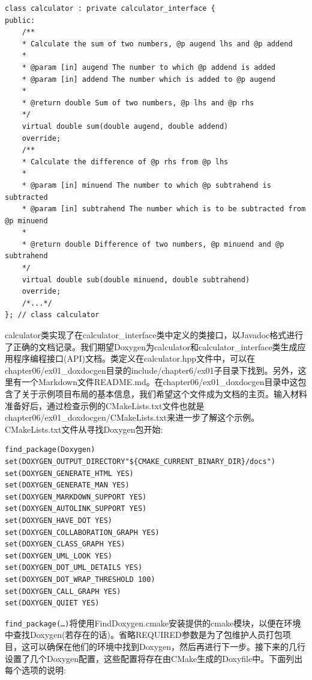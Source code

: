 \begin{lstlisting}[style=styleCXX]
class calculator : private calculator_interface {
public:
	/**
	* Calculate the sum of two numbers, @p augend lhs and @p addend
	*
	* @param [in] augend The number to which @p addend is added
	* @param [in] addend The number which is added to @p augend
	*
	* @return double Sum of two numbers, @p lhs and @p rhs
	*/
	virtual double sum(double augend, double addend)
	override;
	/**
	* Calculate the difference of @p rhs from @p lhs
	*
	* @param [in] minuend The number to which @p subtrahend is subtracted
	* @param [in] subtrahend The number which is to be subtracted from @p minuend
	*
	* @return double Difference of two numbers, @p minuend and @p subtrahend
	*/
	virtual double sub(double minuend, double subtrahend)
	override;
	/*...*/
}; // class calculator
\end{lstlisting}

calculator类实现了在calculator\_interface类中定义的类接口，以Javadoc格式进行了正确的文档记录。我们期望Doxygen为calculator和calculator\_interface类生成应用程序编程接口(API)文档。类定义在calculator.hpp文件中，可以在chapter06/ex01\_doxdocgen目录的include/chapter6/ex01子目录下找到。另外，这里有一个Markdown文件README.md。在chapter06/ex01\_doxdocgen目录中这包含了关于示例项目布局的基本信息，我们希望这个文件成为文档的主页。输入材料准备好后，通过检查示例的CMakeLists.txt文件也就是chapter06/ex01\_doxdocgen/CMakeLists.txt来进一步了解这个示例。CMakeLists.txt文件从寻找Doxygen包开始:

\begin{lstlisting}[style=styleCMake]
find_package(Doxygen)
set(DOXYGEN_OUTPUT_DIRECTORY"${CMAKE_CURRENT_BINARY_DIR}/docs")
set(DOXYGEN_GENERATE_HTML YES)
set(DOXYGEN_GENERATE_MAN YES)
set(DOXYGEN_MARKDOWN_SUPPORT YES)
set(DOXYGEN_AUTOLINK_SUPPORT YES)
set(DOXYGEN_HAVE_DOT YES)
set(DOXYGEN_COLLABORATION_GRAPH YES)
set(DOXYGEN_CLASS_GRAPH YES)
set(DOXYGEN_UML_LOOK YES)
set(DOXYGEN_DOT_UML_DETAILS YES)
set(DOXYGEN_DOT_WRAP_THRESHOLD 100)
set(DOXYGEN_CALL_GRAPH YES)
set(DOXYGEN_QUIET YES)
\end{lstlisting}

\texttt{find\_package(…)}将使用FindDoxygen.cmake安装提供的cmake模块，以便在环境中查找Doxygen(若存在的话)。省略REQUIRED参数是为了包维护人员打包项目，这可以确保在他们的环境中找到Doxygen，然后再进行下一步。接下来的几行设置了几个Doxygen配置，这些配置将存在由CMake生成的Doxyfile中。下面列出每个选项的说明:

